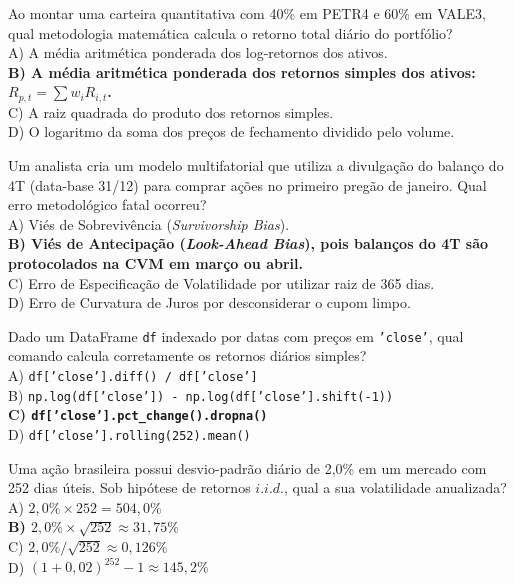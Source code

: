 \documentclass[11pt,a4paper]{article}
\begin{document}
\begin{infobox}
Ao montar uma carteira quantitativa com 40\% em PETR4 e 60\% em VALE3, qual metodologia matemática calcula o retorno total diário do portfólio?\\
A) A média aritmética ponderada dos log-retornos dos ativos.\\
\textbf{B) A média aritmética ponderada dos retornos simples dos ativos: $R_{p,t} = \sum w_i R_{i,t}$.}\\
C) A raiz quadrada do produto dos retornos simples.\\
D) O logaritmo da soma dos preços de fechamento dividido pelo volume.
\end{infobox}

\begin{infobox}
Um analista cria um modelo multifatorial que utiliza a divulgação do balanço do 4T (data-base 31/12) para comprar ações no primeiro pregão de janeiro. Qual erro metodológico fatal ocorreu?\\
A) Viés de Sobrevivência (\textit{Survivorship Bias}).\\
\textbf{B) Viés de Antecipação (\textit{Look-Ahead Bias}), pois balanços do 4T são protocolados na CVM em março ou abril.}\\
C) Erro de Especificação de Volatilidade por utilizar raiz de 365 dias.\\
D) Erro de Curvatura de Juros por desconsiderar o cupom limpo.
\end{infobox}

\begin{infobox}
Dado um DataFrame \texttt{df} indexado por datas com preços em \texttt{'close'}, qual comando calcula corretamente os retornos diários simples?\\
A) \texttt{df['close'].diff() / df['close']}\\
B) \texttt{np.log(df['close']) - np.log(df['close'].shift(-1))}\\
\textbf{C) \texttt{df['close'].pct_change().dropna()}}\\
D) \texttt{df['close'].rolling(252).mean()}
\end{infobox}

\begin{infobox}
Uma ação brasileira possui desvio-padrão diário de 2,0\% em um mercado com 252 dias úteis. Sob hipótese de retornos $i.i.d.$, qual a sua volatilidade anualizada?\\
A) $2,0\% \times 252 = 504,0\%$\\
\textbf{B) $2,0\% \times \sqrt{252} \approx 31,75\%$}\\
C) $2,0\% / \sqrt{252} \approx 0,126\%$\\
D) $(1 + 0,02)^{252} - 1 \approx 145,2\%$
\end{infobox}
\end{document}
